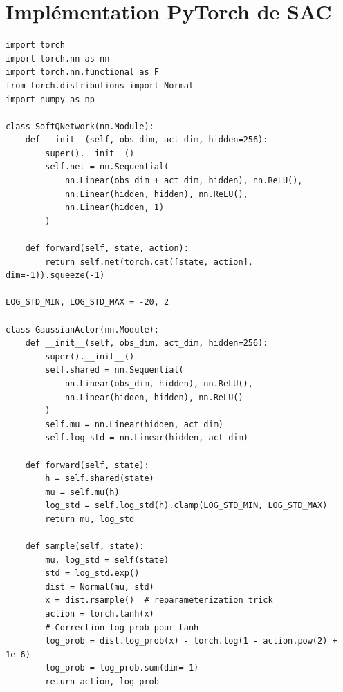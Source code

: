 \section{Impl\'ementation PyTorch de SAC}

\begin{codeblock}[title=\textbf{SAC --- R\'eseaux}]
\begin{verbatim}
import torch
import torch.nn as nn
import torch.nn.functional as F
from torch.distributions import Normal
import numpy as np

class SoftQNetwork(nn.Module):
    def __init__(self, obs_dim, act_dim, hidden=256):
        super().__init__()
        self.net = nn.Sequential(
            nn.Linear(obs_dim + act_dim, hidden), nn.ReLU(),
            nn.Linear(hidden, hidden), nn.ReLU(),
            nn.Linear(hidden, 1)
        )

    def forward(self, state, action):
        return self.net(torch.cat([state, action], dim=-1)).squeeze(-1)

LOG_STD_MIN, LOG_STD_MAX = -20, 2

class GaussianActor(nn.Module):
    def __init__(self, obs_dim, act_dim, hidden=256):
        super().__init__()
        self.shared = nn.Sequential(
            nn.Linear(obs_dim, hidden), nn.ReLU(),
            nn.Linear(hidden, hidden), nn.ReLU()
        )
        self.mu = nn.Linear(hidden, act_dim)
        self.log_std = nn.Linear(hidden, act_dim)

    def forward(self, state):
        h = self.shared(state)
        mu = self.mu(h)
        log_std = self.log_std(h).clamp(LOG_STD_MIN, LOG_STD_MAX)
        return mu, log_std

    def sample(self, state):
        mu, log_std = self(state)
        std = log_std.exp()
        dist = Normal(mu, std)
        x = dist.rsample()  # reparameterization trick
        action = torch.tanh(x)
        # Correction log-prob pour tanh
        log_prob = dist.log_prob(x) - torch.log(1 - action.pow(2) + 1e-6)
        log_prob = log_prob.sum(dim=-1)
        return action, log_prob
\end{verbatim}
\end{codeblock}

